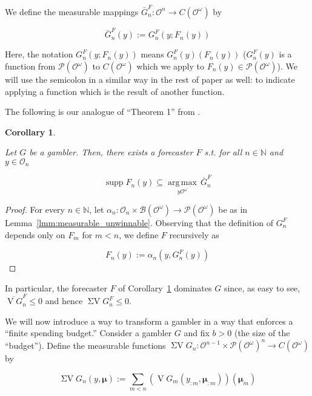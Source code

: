 \documentclass[11pt]{article}
\theoremstyle{definition}
\theoremstyle{plain}
\newtheorem{corollary}{Corollary}%
\newcommand{\Nats}{\mathbb{N}}
\newcommand{\Argmax}[1]{\underset{#1}{\operatorname{arg\,max}}\,}
\newcommand{\PM}{\mathcal{P}}
\DeclareMathOperator{\Sp}{supp}
\newcommand{\Ob}{\mathcal{O}}
\newcommand{\OO}{\Ob^\omega}
\newcommand{\PMO}{\PM(\OO)}
\newcommand{\Gm}{\mathcal{B}}
\newcommand{\GMO}{\Gm(\OO)}
\newcommand{\CO}{C(\OO)}
\DeclareMathOperator{\V}{V}
\DeclareMathOperator{\SV}{\Sigma V}
\newcommand{\BM}{\bm{\mu}}
\begin{document}
We define the measurable mappings $\bar{G}^F_n: \Ob^n \rightarrow \CO$ by

\begin{equation}
\bar{G}^F_n\left(y\right) := G^F_n\left(y;F_n\left(y\right)\right)
\end{equation}

Here, the notation $G^F_n\left(y;F_n\left(y\right)\right)$ means $G^F_n(y)\left(F_n\left(y\right)\right)$ ($G^F_n(y)$ is a function from $\PMO$ to $\CO$ which we apply to $F_n\left(y\right)\in\PMO$). We will use the semicolon in a similar way in the rest of paper as well: to indicate applying a function which is the result of another function.

The following is our analogue of \enquote{Theorem 1} from \cite{Vovk_2005}.

\begin{corollary}
\label{crl:dominate_one}

Let $G$ be a gambler. Then, there exists a forecaster $F$ s.t. for all $n \in \Nats$ and $y \in \Ob_n$

\begin{equation}
\Sp F_n\left(y\right) \subseteq \Argmax{y\OO} \bar{G}^F_n
\end{equation}

\end{corollary}

\begin{proof}

For every $n \in \Nats$, let $\alpha_n: \Ob_n \times \GMO \rightarrow \PMO$ be as in Lemma~\ref{lmm:measurable_unwinnable}. Observing that the definition of $G^F_n$ depends only on $F_m$ for $m < n$, we define $F$ recursively as

\[F_n\left(y\right):=\alpha_n\left(y,G^F_n\left(y\right)\right)\]
\end{proof}

In particular, the forecaster $F$ of Corollary~\ref{crl:dominate_one} dominates $G$ since, as easy to see, $\overline{\V G}^F_n \leq 0$ and hence $\SV G^F_n \leq 0$.

We will now introduce a way to transform a gambler in a way that enforces a \enquote{finite spending budget.} Consider a gambler $G$ and fix $b > 0$ (the size of the \enquote{budget}). Define the measurable functions $\SV G_n: \Ob^{n-1} \times \PMO^n  \rightarrow \CO$ by

\begin{equation}
\SV G_n\left(y,\BM\right) := \sum_{m < n} \left(\V G_m\left(y_{:m},\BM_{:m}\right)\right)\left(\BM_m\right)
\end{equation}
\end{document}
